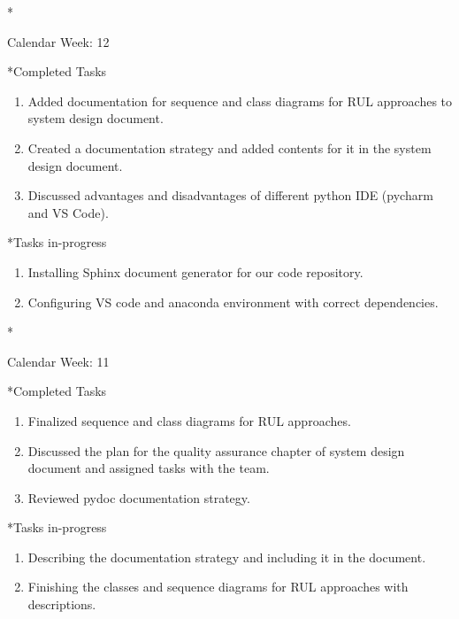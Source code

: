 \documentclass[11pt,a4paper]{article}
\begin{document}
\newpage
\begin{section}*{Calendar Week: 12  \hfill \date{26 March, 2021}}
 \begin{refsection}
     \begin{subsection}*{Completed Tasks}
         \begin{enumerate}
             \item Added documentation for sequence and class diagrams for RUL approaches to system design document.
             \item Created a documentation strategy and added contents for it in the system design document.
             \item Discussed advantages and disadvantages of different python IDE (pycharm and VS Code).
         \end{enumerate}
     \end{subsection}
     \begin{subsection}*{Tasks in-progress}
         \begin{enumerate}
             \item Installing Sphinx document generator for our code repository.
             \item Configuring VS code and anaconda environment with correct dependencies.
         \end{enumerate}
     \end{subsection}
 \end{refsection}
\end{section}

\newpage
\begin{section}*{Calendar Week: 11  \hfill \date{19 March, 2021}}
 \begin{refsection}
     \begin{subsection}*{Completed Tasks}
         \begin{enumerate}
             \item Finalized sequence and class diagrams for RUL approaches.
             \item Discussed the plan for the quality assurance chapter of system design document and assigned tasks with the team.
             \item Reviewed pydoc documentation strategy.
         \end{enumerate}
     \end{subsection}
     \begin{subsection}*{Tasks in-progress}
         \begin{enumerate}
             \item Describing the documentation strategy and including it in the document.
             \item Finishing the classes and sequence diagrams for RUL approaches with descriptions.
         \end{enumerate}
     \end{subsection}
 \end{refsection}
\end{section}
\end{document}
